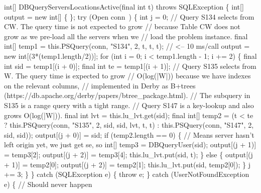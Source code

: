 int[] DBQueryServersLocationsActive(final int t) throws SQLException \{
  int[] output = new int[] \{ \};
  try (\LA{}Open \code{}conn\edoc{}~{\nwtagstyle{}}\RA{}) \{
    int j = 0;
\eatline
{}\nwendcode{}
\nwenddocs{}\plusendmoddef
    // Query S134 selects from CW. The query time is not expected to grow
    // because Table CW does not grow as we pre-load all the servers when we
    // load the problem instance.
    final int[] temp1 = this.PSQuery(conn, "S134", 2, t, t, t);  // <-- 10 ms/call
    output = new int[(3*(temp1.length/2))];
    for (int i = 0; i < temp1.length - 1; i += 2) \{
      final int sid = temp1[(i + 0)];
      final int  te = temp1[(i + 1)];
      // Query S135 selects from W. The query time is expected to grow
      // O(log(|W|)) because we have indexes on the relevant columns,
      // implemented in Derby as B+trees (https://db.apache.org/derby/papers/btree_package.html).
      // The subquery in S135 is a range query with a tight range.
      // Query S147 is a key-lookup and also grows O(log(|W|)).
      final int lvt = this.lu_lvt.get(sid);
      final int[] temp2 = (t < te
        ? this.PSQuery(conn, "S135", 2, sid, sid, lvt, t, t)
        : this.PSQuery(conn, "S147", 2, sid, sid));
      output[(j + 0)] = sid;
      if (temp2.length == 0) \{
        // Means server hasn't left origin yet, we just get se, so
        int[] temp3 = DBQueryUser(sid);
        output[(j + 1)] = temp3[2];
        output[(j + 2)] = temp3[4];
        this.lu_lvt.put(sid, t);
      \} else \{
        output[(j + 1)] = temp2[0];
        output[(j + 2)] = temp2[1];
        this.lu_lvt.put(sid, temp2[0]);
      \}
      j += 3;
    \}
  \} catch (SQLException e) \{
    throw e;
  \} catch (UserNotFoundException e) \{
    // Should never happen
